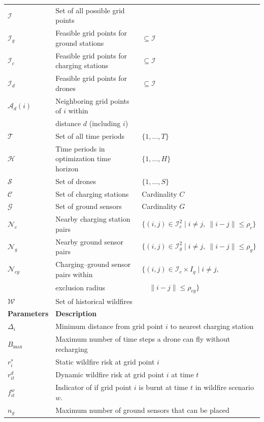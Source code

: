\documentclass{article}
\newcommand{\set}[1]{\mathcal{#1}}
\newcommand{\norm}[1]{\big\| #1\big\| }
\begin{document}
\begin{longtable}{lll}
$\set I$ & Set of all possible grid points & \\
$\set I_g$ & Feasible grid points for ground stations & $\subseteq \set I$ \\
$\set I_c$ & Feasible grid points for charging stations & $\subseteq \set I$ \\
$\set I_d$ & Feasible grid points for drones & $\subseteq \set I$ \\
$\set A_d(i)$ & Neighboring grid points of $i$ within \\
& distance $d$ (including $i$) & \\
$\set T$ & Set of all time periods & $\{1, \ldots, T\}$ \\
$\set H$ & Time periods in optimization time horizon & $\{1, \ldots, H\}$ \\
$\set S$ & Set of drones & $\{1, \ldots, S\}$ \\
$\set C$ & Set of charging stations & Cardinality $C$ \\
$\set G$ & Set of ground sensors & Cardinality $G$ \\
$\set N_{c}$ & Nearby charging station pairs & $\{(i,j) \in \set I_c^2 \mid i \neq j, \ \norm{i-j} \leq \rho_c\}$ \\
$\set N_{g}$ & Nearby ground sensor pairs & $\{(i,j) \in \set I_g^2 \mid i \neq j, \ \norm{i-j} \leq \rho_g\}$ \\
$\set N_{cg}$ & Charging–ground sensor pairs within & $\{(i,j) \in \set I_c \times I_g \mid i \neq j,$ \\
& exclusion radius & $\quad \norm{i-j} \leq \rho_{cg}\}$\\
$\set W$ & Set of historical wildfires \\
\midrule
\textbf{Parameters} & \multicolumn{2}{l}{\textbf{Description}} \\
\midrule
$\Delta_i$ & \multicolumn{2}{l}{Minimum distance from grid point $i$ to nearest charging station} \\
$B_{\text{max}}$ & \multicolumn{2}{l}{Maximum number of time steps a drone can fly without recharging} \\
$r_{i}^s$ & \multicolumn{2}{l}{Static wildfire risk at grid point $i$} \\
$r_{it}^d$ & \multicolumn{2}{l}{Dynamic wildfire risk at grid point $i$ at time $t$} \\
$f_{it}^w$ & \multicolumn{2}{l}{Indicator of if grid point $i$ is burnt at time $t$ in wildfire scenario $w$.} \\
$n_g$ & \multicolumn{2}{l}{Maximum number of ground sensors that can be placed} \\

\end{longtable}
\end{document}
